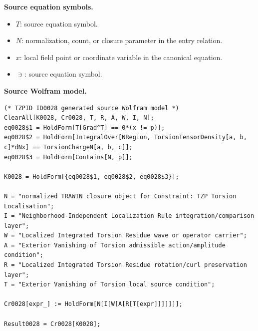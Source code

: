 \begin{minipage}[t]{0.49\linewidth}
\begingroup
\small
\raggedright
\textbf{Source equation symbols.}\par
\begin{itemize}[leftmargin=1.35em,itemsep=1pt,topsep=1pt,parsep=0pt]
    \item $T$: source equation symbol.
    \item $N$: normalization, count, or closure parameter in the entry relation.
    \item $x$: local field point or coordinate variable in the canonical equation.
    \item $\ni$: source equation symbol.
\end{itemize}
\endgroup
\end{minipage}\hfill
\begin{minipage}[t]{0.47\linewidth}
\begingroup
\scriptsize
\raggedright
\textbf{Source Wolfram model.}\par
\begin{Verbatim}[fontsize=\tiny,breaklines=true,breakanywhere=true]
(* TZPID ID0028 generated source Wolfram model *)
ClearAll[K0028, Cr0028, T, R, A, W, I, N];
eq0028$1 = HoldForm[T[Grad^T] == 0*(x != p)];
eq0028$2 = HoldForm[IntegralOver[NRegion, TorsionTensorDensity[a, b, c]*dNx] == TorsionChargeN[a, b, c]];
eq0028$3 = HoldForm[Contains[N, p]];

K0028 = HoldForm[{eq0028$1, eq0028$2, eq0028$3}];

N = "normalized TRAWIN closure object for Constraint: TZP Torsion Localisation";
I = "Neighborhood-Independent Localization Rule integration/comparison layer";
W = "Localized Integrated Torsion Residue wave or operator carrier";
A = "Exterior Vanishing of Torsion admissible action/amplitude condition";
R = "Localized Integrated Torsion Residue rotation/curl preservation layer";
T = "Exterior Vanishing of Torsion local source condition";

Cr0028[expr_] := HoldForm[N[I[W[A[R[T[expr]]]]]]];

Result0028 = Cr0028[K0028];
\end{Verbatim}
\endgroup
\end{minipage}

